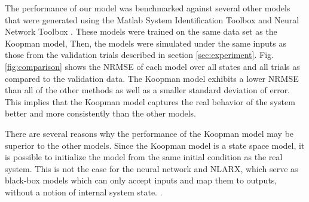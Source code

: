 The performance of our model was benchmarked against several other models that were generated using the Matlab System Identification Toolbox and Neural Network Toolbox \cite{MATLAB:2017}.
These models were trained on the same data set as the Koopman model, 
Then, the models were simulated under the same inputs as those from the validation trials described in section \ref{sec:experiment}.
 
Fig. \ref{fig:comparison} shows the NRMSE of each model over all states and all trials as compared to the validation data.
The Koopman model exhibits a lower NRMSE than all of the other methods as well as a smaller standard deviation of error. 
This implies that the Koopman model captures the real behavior of the system better and more consistently than the other models. 

There are several reasons why the performance of the Koopman model may be superior to the other models.
Since the Koopman model is a state space model, it is possible to initialize the model from the same initial condition as the real system.
This is not the case for the neural network and NLARX, which serve as black-box models which can only accept inputs and map them to outputs, without a notion of internal system state.
.


